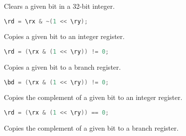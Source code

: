 Clears a given bit in a 32-bit integer.

\begin{lstlisting}[numbers=none, basicstyle=\ttfamily\footnotesize, language=C++]
\rd = \rx & ~(1 << \ry);
\end{lstlisting}

Copies a given bit to an integer register.

\begin{lstlisting}[numbers=none, basicstyle=\ttfamily\footnotesize, language=C++]
\rd = (\rx & (1 << \ry)) != 0;
\end{lstlisting}

Copies a given bit to a branch register.

\begin{lstlisting}[numbers=none, basicstyle=\ttfamily\footnotesize, language=C++]
\bd = (\rx & (1 << \ry)) != 0;
\end{lstlisting}

Copies the complement of a given bit to an integer register.

\begin{lstlisting}[numbers=none, basicstyle=\ttfamily\footnotesize, language=C++]
\rd = (\rx & (1 << \ry)) == 0;
\end{lstlisting}

Copies the complement of a given bit to a branch register.

